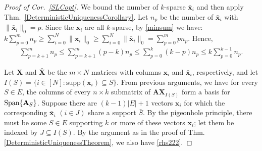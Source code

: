 \documentclass[9pt,twocolumn]{pnas-new}
\begin{document}
 \begin{proof}[Proof of Cor.~\ref{SLCopt}]
We bound the number of $k$-sparse $\mathbf{\bar x}_i$ and then apply Thm.~\ref{DeterministicUniquenessCorollary}. 
Let $n_p$ be the number of $\mathbf{\bar x}_i$ with $\|\mathbf{\bar x}_i\|_0 = p$.  %
Since the $\mathbf{x}_i$ are all $k$-sparse, by \eqref{minsum} we have:
\mbox{$k \sum_{p = 0}^{m} n_p \geq \sum_{i=0}^N \|\mathbf{x}_i\|_0 \geq \sum_{i=0}^N \|\mathbf{\bar x}_i\|_0 = \sum_{p=0}^{m} p n_p.$}
Hence,
\begin{align}\label{eqn}
\sum_{p = k+1}^m n_p \leq \sum_{p = k+1}^m (p-k) n_p \leq \sum_{p = 0}^k (k-p)n_p \leq k \sum_{p = 0}^{k-1} n_p.
\end{align}

Let $\mathbf{X}$ and $\mathbf{\bar{X}}$ be the $m \times N$ matrices with columns $\mathbf{x}_i$ and $\mathbf{\bar x}_i$, respectively, and let $I(S) = \{i \in [N]: \text{supp}(\mathbf{x}_i) \subseteq S\}$. From previous arguments, we have for every $S \in E$, the columns of every $n \times k$ submatrix of $\mathbf{AX}_{I(S)}$ form a basis for $\text{\rm Span}\{\mathbf{A}_S\}$.
Suppose there are $(k-1)|E| + 1$ vectors $\mathbf{x}_i$ for which the corresponding $\mathbf{\bar x}_i$ $(i \in J)$ share a support $\bar S$. By the pigeonhole principle, there must be some $S \in E$ supporting $k$ or more of these vectors $\mathbf{x}_i$; let them be indexed by $J \subseteq I(S)$.  By the argument as in the proof of Thm.\ref{DeterministicUniquenessTheorem}, we also have \eqref{rhs222}.



\end{proof}
\end{document}
